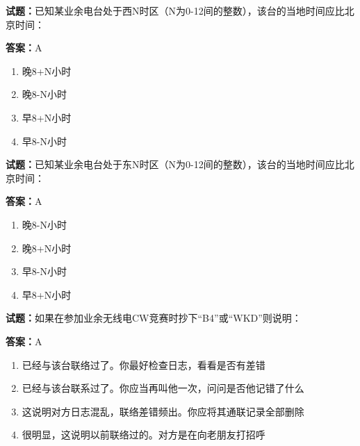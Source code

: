 \documentclass{ctexbook}
\begin{document}
\textbf{试题：}已知某业余电台处于西N时区（N为0-12间的整数），该台的当地时间应比北京时间： 

\textbf{答案：}A 

\begin{enumerate}[leftmargin=3em]
  \item 晚8+N小时 

  \item 晚8-N小时 

  \item 早8+N小时 

  \item 早8-N小时 

\end{enumerate}





\vspace{1em}

\textbf{试题：}已知某业余电台处于东N时区（N为0-12间的整数），该台的当地时间应比北京时间： 

\textbf{答案：}A 

\begin{enumerate}[leftmargin=3em]
  \item 晚8-N小时 

  \item 晚8+N小时 

  \item 早8-N小时 

  \item 早8+N小时 

\end{enumerate}





\vspace{1em}

\textbf{试题：}如果在参加业余无线电CW竞赛时抄下“B4”或“WKD”则说明： 

\textbf{答案：}A 

\begin{enumerate}[leftmargin=3em]
  \item 已经与该台联络过了。你最好检查日志，看看是否有差错 

  \item 已经与该台联系过了。你应当再叫他一次，问问是否他记错了什么 

  \item 这说明对方日志混乱，联络差错频出。你应将其通联记录全部删除 

  \item 很明显，这说明以前联络过的。对方是在向老朋友打招呼 

\end{enumerate}
\end{document}
